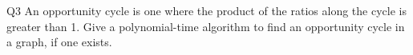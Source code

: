 \begin{problem}
  {Q3}
  An opportunity cycle is one where the product of the ratios along the cycle is greater than 1.
  Give a polynomial-time algorithm to find an opportunity cycle in a graph, if one exists.
\end{problem}
